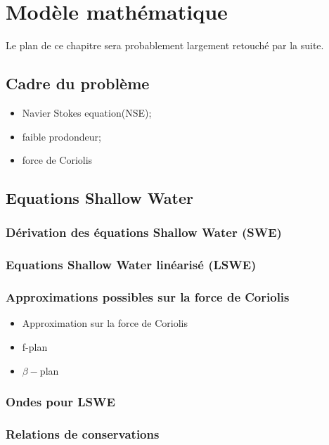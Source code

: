 
\chapter{Modèle mathématique}

Le plan de ce chapitre sera probablement largement retouché par la suite.

\section{Cadre du problème}

\begin{itemize}
\item Navier Stokes equation(NSE);
\item faible prodondeur;
\item force de Coriolis
\end{itemize}

\section{Equations Shallow Water}

\subsection{Dérivation des équations Shallow Water (SWE)}

\subsection{Equations Shallow Water linéarisé (LSWE)}

\subsection{Approximations possibles sur la force de Coriolis}

\begin{itemize}
\item Approximation sur la force de Coriolis
\item f-plan
\item $\beta-$plan
\end{itemize}

\subsection{Ondes pour LSWE}

\subsection{Relations de conservations}